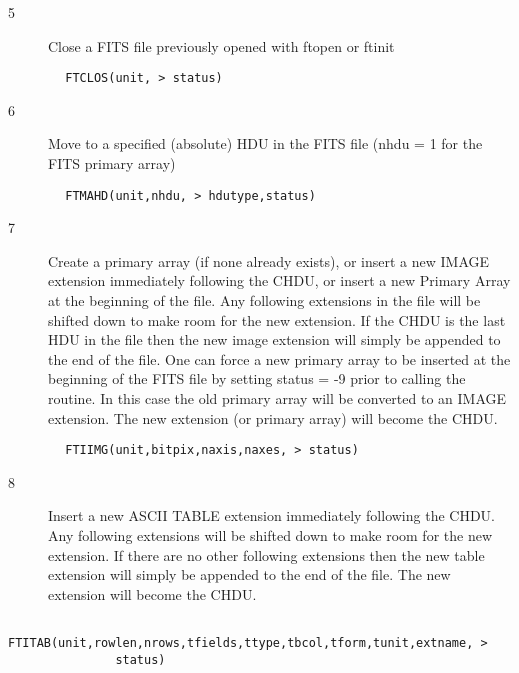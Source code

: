 \documentclass[11pt]{book}
\begin{document}
\begin{description}
\item[5 ]Close a FITS file previously opened with ftopen or ftinit
\end{description}

\begin{verbatim}
        FTCLOS(unit, > status)
\end{verbatim}

\begin{description}
\item[6 ] Move to a specified (absolute) HDU in the FITS file (nhdu = 1 for the
   FITS primary array)
\end{description}

\begin{verbatim}
        FTMAHD(unit,nhdu, > hdutype,status)
\end{verbatim}

\begin{description}
\item[7 ] Create a primary array (if none already exists), or insert a
    new IMAGE extension immediately following the CHDU, or
    insert a new Primary Array at the beginning of the file.  Any
    following extensions in the file will be shifted down to make room
    for the new extension.  If the CHDU is the last HDU in the file
    then the new image extension will simply be appended to the end of
    the file.   One can force a new primary array to be inserted at the
    beginning of the FITS file by setting status = -9 prior
    to calling the routine.  In this case the old primary array will be
    converted to an IMAGE extension. The new extension (or primary
   array) will become the CHDU.
\end{description}

\begin{verbatim}
        FTIIMG(unit,bitpix,naxis,naxes, > status)
\end{verbatim}

\begin{description}
\item[8 ] Insert a new ASCII TABLE extension immediately following the CHDU.
    Any following extensions will be shifted down to make room for
    the new extension.  If there are no other following extensions
    then the new table extension will simply be appended to the
   end of the file.  The new extension will become the CHDU.
\end{description}

\begin{verbatim}
        FTITAB(unit,rowlen,nrows,tfields,ttype,tbcol,tform,tunit,extname, >
               status)
\end{verbatim}
\end{document}

